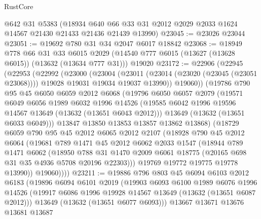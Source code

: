 \begin{lexlean}{RustCore}
\begin{coremodule}
    @642
    @31
    @5383
    (@18934 @640 @66 @33 @31 @2012 @2029 @2033 @1624 @14567 @21430 @21433 @21436 @21439 @13990)
@23045 := @23026 @23044
@23051 := @19692 @780 @31 @34 @2047 @6017 @18842
@23068 := @18949
    @778
    @66
    @31
    @33
    @6015
    @2029
    (@14540 @777 @6015 (@13627 (@13628 @6015)) (@13632 (@13634 @777 @31)))
    @19020
@23172 := @22906
    (@22945
      (@22953
        (@22992
          (@23000
            (@23004
              (@23011
                (@23014 (@23020 (@23045 (@23051 @23068))))
                @19028
                @19031
                @19034
                @19037
                @13990))
            @19060))
        (@19786
          @790
          @95
          @45
          @6050
          @6059
          @2012
          @6068
          (@19796
            @6050
            @6057
            @2079
            (@19571
              @6049
              @6056
              @1989
              @6032
              @1996
              @14526
              (@19585 @6042 @1996 @19596 @14567 @13649 (@13632 (@13651 @6043 @2012)))
              @13649
              (@13632 (@13651 @6033 @6049)))
            @13847
            @13850
            @13853
            @13857
            @13862
            @13868)
          (@18729
            @6059
            @790
            @95
            @45
            @2012
            @6065
            @2012
            @2107
            (@18928
              @790
              @45
              @2012
              @6064
              (@19681
                @789
                @1471
                @45
                @2012
                @6062
                @2033
                @1547
                (@18944
                  @789
                  @1471
                  @6062
                  (@18950
                    @788
                    @31
                    @1470
                    @2009
                    @6061
                    @18775
                    (@20165 @698 @31 @35 @4936 @5708 @20196 @22303)))
                @19769
                @19772
                @19775
                @19778
                @13990))
            @19060))))
@23211 := @19886
    @796
    @803
    @45
    @6094
    @6103
    @2012
    @6183
    (@19896
      @6094
      @6101
      @2019
      (@19903
        @6093
        @6100
        @1989
        @6076
        @1996
        @14526
        (@19917 @6086 @1996 @19928 @14567 @13649 (@13632 (@13651 @6087 @2012)))
        @13649
        (@13632 (@13651 @6077 @6093)))
      @13667
      @13671
      @13676
      @13681
      @13687

\end{coremodule}
\end{lexlean}
